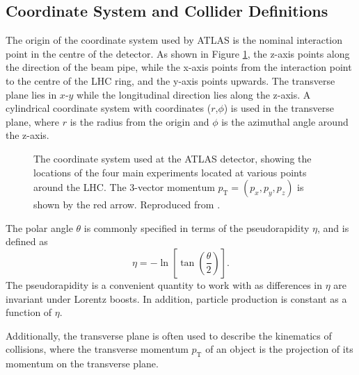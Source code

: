 \subsection{Coordinate System and Collider Definitions}
\label{coordinate-system}


The origin of the coordinate system used by ATLAS is the nominal interaction point in the centre of the detector. As shown in Figure \ref{fig:atlas-coord-system}, the z-axis points along the direction of the beam pipe, while the x-axis points from the interaction point to the centre of the \ac{LHC} ring, and the y-axis points upwards.
The transverse plane lies in $x$-$y$ while the longitudinal direction lies along the z-axis. A cylindrical coordinate system with coordinates ($r$,$\phi$) is used in the transverse plane, where $r$ is the radius from the origin and $\phi$ is the azimuthal angle around the z-axis.

\begin{figure}[!htbp]
  \centering
  
  \caption{
    The coordinate system used at the ATLAS detector, showing the locations of the four main experiments located at various points around the \ac{LHC}. The 3-vector momentum $p_{\text{T}} = (p_x, p_y, p_z)$ is shown by the red arrow. Reproduced from \cite{Strong:2020mge}.
  }
  \label{fig:atlas-coord-system}
\end{figure}


The polar angle $\theta$ is commonly specified in terms of the pseudorapidity $\eta$, and is defined as
%
\begin{equation}\label{eq:pseudorap}
  \eta = - \ln \left[ \tan \left( \frac{\theta}{2} \right) \right] .
\end{equation}
%
The pseudorapidity is a convenient quantity to work with as differences in $\eta$ are invariant under Lorentz boosts. In addition, particle production is constant as a function of $\eta$.

Additionally, the transverse plane is often used to describe the kinematics of collisions, where the transverse momentum $p_{\text{T}}$ of an object is the projection of its momentum on the transverse plane.

